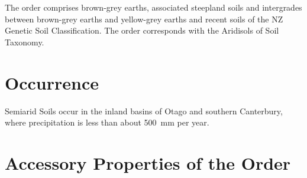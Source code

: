 \documentclass[
  letterpaper,
  DIV=11,
  numbers=noendperiod]{scrreprt}
\begin{document}
The order comprises brown-grey earths, associated steepland soils and
intergrades between brown-grey earths and yellow-grey earths and recent
soils of the NZ Genetic Soil Classification. The order corresponds with
the Aridisols of Soil Taxonomy.

\hypertarget{sec-occ-S}{%
\section{Occurrence}\label{sec-occ-S}}

Semiarid Soils occur in the inland basins of Otago and southern
Canterbury, where precipitation is less than about 500~mm per year.

\hypertarget{sec-acc-S}{%
\section{Accessory Properties of the Order}\label{sec-acc-S}}
\end{document}
